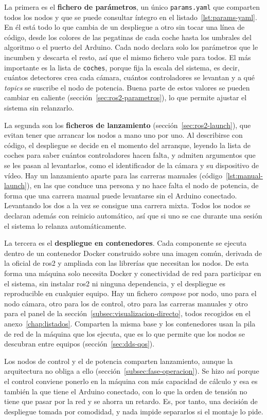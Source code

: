 La primera  es el \textbf{fichero de parámetros}\label{subsec:params-yaml}, un único \texttt{params.yaml} que comparten todos los nodos y que se puede consultar íntegro en el listado~\ref{lst:params-yaml}. En él está todo lo que cambia de un despliegue a otro sin tocar una línea de código, desde los colores de las pegatinas de cada coche hasta los umbrales del algoritmo o el puerto del Arduino. Cada nodo declara solo los parámetros que le incumben y descarta el resto, así que el mismo fichero vale para todos. El más importante es la lista de \texttt{coches}, porque fija la escala del sistema, es decir, cuántos detectores crea cada cámara, cuántos controladores se levantan y a qué \emph{topics} se suscribe el nodo de potencia. Buena parte de estos valores se pueden cambiar en caliente (sección~\ref{sec:ros2-parametros}), lo que permite ajustar el sistema sin relanzarlo.

La segunda son los \textbf{ficheros de lanzamiento}\label{subsec:launch-files} (sección~\ref{sec:ros2-launch}), que evitan tener que arrancar los nodos a mano uno por uno. Al describirse con código, el despliegue se decide en el momento del arranque, leyendo la lista de coches para saber cuántos controladores hacen falta, y admiten argumentos que se les pasan al levantarlos, como el identificador de la cámara y su dispositivo de vídeo. Hay un lanzamiento aparte para las carreras manuales (código~\ref{lst:manual-launch}), en las que conduce una persona y no hace falta el nodo de potencia, de forma que una carrera manual puede levantarse sin el Arduino conectado. Levantando los dos a la vez se consigue una carrera mixta. Todos los nodos se declaran además con reinicio automático, así que si uno se cae durante una sesión el sistema lo relanza automáticamente. %

La tercera es el \textbf{despliegue en contenedores}\label{subsec:despliegue-docker}. Cada componente se ejecuta dentro de un contenedor Docker construido sobre una imagen común, derivada de la oficial de \gls{ros2} y ampliada con las librerías que necesitan los nodos. De esta forma una máquina solo necesita Docker y conectividad de red para participar en el sistema, sin instalar \gls{ros2} ni ninguna dependencia, y el despliegue es reproducible en cualquier equipo. Hay un fichero \emph{compose} por nodo, uno para el nodo cámara, otro para los de control, otro para las carreras manuales y otro para el panel de la sección~\ref{subsec:visualizacion-directo}, todos recogidos en el anexo~\ref{chap:listados}. Comparten la misma base y %
los contenedores usan la pila de red de la máquina que los ejecuta, que es lo que permite que los nodos se descubran entre equipos (sección~\ref{sec:dds-qos}).

Los nodos de control y el de potencia comparten lanzamiento, aunque la arquitectura no obliga a ello (sección~\ref{subsec:fase-operacion}). Se hizo así porque el control conviene ponerlo en la máquina con más capacidad de cálculo y esa es también la que tiene el Arduino conectado, con lo que la orden de tensión no tiene que pasar por la red y se ahorra un retardo. Es, por tanto, una decisión de despliegue tomada por comodidad, y nada impide separarlos si el montaje lo pide.
